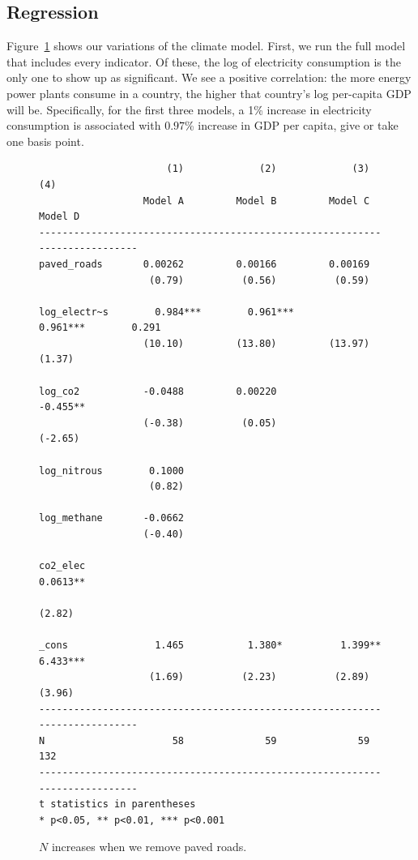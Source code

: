 \documentclass[12pt]{article}
\begin{document}
\subsection{Regression}
Figure~\ref{climate_model_regressions} shows our variations of the climate model.
First, we run the full model that includes every indicator.
Of these, the log of electricity consumption is the only one to show up as significant.
We see a positive correlation: the more energy power plants consume in a country, the higher that country's log per-capita GDP will be.
Specifically, for the first three models, a 1\% increase in electricity consumption is associated with $0.97$\% increase in GDP per capita, give or take one basis point.

\begin{figure}[h!]
\begin{singlespace}
\scriptsize
\begin{verbatim}
                      (1)             (2)             (3)             (4)   
                  Model A         Model B         Model C         Model D   
----------------------------------------------------------------------------
paved_roads       0.00262         0.00166         0.00169                   
                   (0.79)          (0.56)          (0.59)                   

log_electr~s        0.984***        0.961***        0.961***        0.291   
                  (10.10)         (13.80)         (13.97)          (1.37)   

log_co2           -0.0488         0.00220                          -0.455** 
                  (-0.38)          (0.05)                         (-2.65)   

log_nitrous        0.1000                                                   
                   (0.82)                                                   

log_methane       -0.0662                                                   
                  (-0.40)                                                   

co2_elec                                                           0.0613** 
                                                                   (2.82)   

_cons               1.465           1.380*          1.399**         6.433***
                   (1.69)          (2.23)          (2.89)          (3.96)   
----------------------------------------------------------------------------
N                      58              59              59             132   
----------------------------------------------------------------------------
t statistics in parentheses
* p<0.05, ** p<0.01, *** p<0.001
\end{verbatim}
\end{singlespace}
\caption{\label{climate_model_regressions}$N$ increases when we remove paved roads.}
\end{figure}
\end{document}
